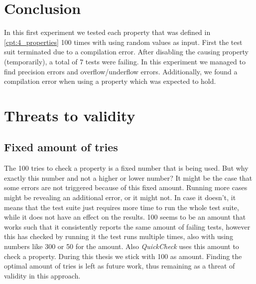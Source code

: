 \section{Conclusion}
In this first experiment we tested each property that was defined in \autoref{cpt:4_properties} 100 times with using random values as input. First the test suit terminated due to a compilation error. After disabling the causing property (temporarily), a total of 7 tests were failing. In this experiment we managed to find precision errors and overflow/underflow errors. Additionally, we found a compilation error when using a property which was expected to hold.

\section{Threats to validity}

\subsection*{Fixed amount of tries}
The 100 tries to check a property is a fixed number that is being used. But why exactly this number and not a higher or lower number? It might be the case that some errors are not triggered because of this fixed amount. Running more cases might be revealing an additional error, or it might not. In case it doesn't, it means that the test suite just requires more time to run the whole test suite, while it does not have an effect on the results. 100 seems to be an amount that works such that it consistently reports the same amount of failing tests, however this has checked by running it the test runs multiple times, also with using numbers like 300 or 50 for the amount. Also \textit{QuickCheck} uses this amount to check a property. During this thesis we stick with 100 as amount. Finding the optimal amount of tries is left as future work, thus remaining as a threat of validity in this approach.

